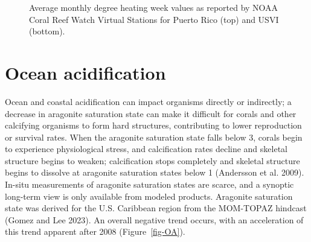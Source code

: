 \documentclass[
  letterpaper,
  oneside,
  open=any]{scrbook}
\begin{document}
\begin{figure}


\caption{\label{fig-DHW}Average monthly degree heating week values as
reported by NOAA Coral Reef Watch Virtual Stations for Puerto Rico (top)
and USVI (bottom).}

\end{figure}%

\section{Ocean acidification}\label{ocean-acidification}

Ocean and coastal acidification can impact organisms directly or
indirectly; a decrease in aragonite saturation state can make it
difficult for corals and other calcifying organisms to form hard
structures, contributing to lower reproduction or survival rates. When
the aragonite saturation state falls below 3, corals begin to experience
physiological stress, and calcification rates decline and skeletal
structure begins to weaken; calcification stops completely and skeletal
structure begins to dissolve at aragonite saturation states below 1
(Andersson et al. 2009). In-situ measurements of aragonite saturation
states are scarce, and a synoptic long-term view is only available from
modeled products. Aragonite saturation state was derived for the U.S.
Caribbean region from the MOM-TOPAZ hindcast (Gomez and Lee 2023). An
overall negative trend occurs, with an acceleration of this trend
apparent after 2008 (Figure~\ref{fig-OA}).
\end{document}
